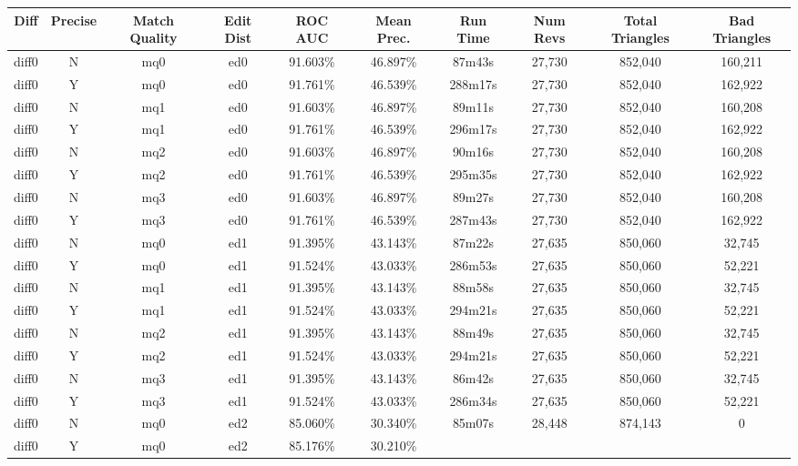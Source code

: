 \begin{sidewaystable}[!tp]
  \begin{center}
    \begin{tabular}{|c|c|c|c||c|c||c|c|c|c|}
\hline
Diff & Precise & Match Quality & Edit Dist
	& ROC AUC & Mean Prec.
	& Run Time & Num Revs
	& Total Triangles & Bad Triangles \\
\hline
\hline
diff0 & N & mq0 & ed0
	& 91.603\% & 46.897\%
	& 87m43s & 27,730
	& 852,040 & 160,211 \\
diff0 & Y & mq0 & ed0
	& 91.761\% & 46.539\%
	& 288m17s & 27,730
	& 852,040 & 162,922 \\
diff0 & N & mq1 & ed0
	& 91.603\% & 46.897\%
	& 89m11s & 27,730
	& 852,040 & 160,208 \\
diff0 & Y & mq1 & ed0
	& 91.761\% & 46.539\%
	& 296m17s & 27,730
	& 852,040 & 162,922 \\
diff0 & N & mq2 & ed0
	& 91.603\% & 46.897\%
	& 90m16s & 27,730
	& 852,040 & 160,208 \\
diff0 & Y & mq2 & ed0
	& 91.761\% & 46.539\%
	& 295m35s & 27,730
	& 852,040 & 162,922 \\
diff0 & N & mq3 & ed0
	& 91.603\% & 46.897\%
	& 89m27s & 27,730
	& 852,040 & 160,208 \\
diff0 & Y & mq3 & ed0
	& 91.761\% & 46.539\%
	& 287m43s & 27,730
	& 852,040 & 162,922 \\
diff0 & N & mq0 & ed1
	& 91.395\% & 43.143\%
	& 87m22s & 27,635
	& 850,060 & 32,745 \\
diff0 & Y & mq0 & ed1
	& 91.524\% & 43.033\%
	& 286m53s & 27,635
	& 850,060 & 52,221 \\
diff0 & N & mq1 & ed1
	& 91.395\% & 43.143\%
	& 88m58s & 27,635
	& 850,060 & 32,745 \\
diff0 & Y & mq1 & ed1
	& 91.524\% & 43.033\%
	& 294m21s & 27,635
	& 850,060 & 52,221 \\
diff0 & N & mq2 & ed1
	& 91.395\% & 43.143\%
	& 88m49s & 27,635
	& 850,060 & 32,745 \\
diff0 & Y & mq2 & ed1
	& 91.524\% & 43.033\%
	& 294m21s & 27,635
	& 850,060 & 52,221 \\
diff0 & N & mq3 & ed1
	& 91.395\% & 43.143\%
	& 86m42s & 27,635
	& 850,060 & 32,745 \\
diff0 & Y & mq3 & ed1
	& 91.524\% & 43.033\%
	& 286m34s & 27,635
	& 850,060 & 52,221 \\
diff0 & N & mq0 & ed2
	& 85.060\% & 30.340\%
	& 85m07s & 28,448
	& 874,143 & 0 \\
diff0 & Y & mq0 & ed2
	& 85.176\% & 30.210\%

\end{tabular}
\end{center}
\end{sidewaystable}
